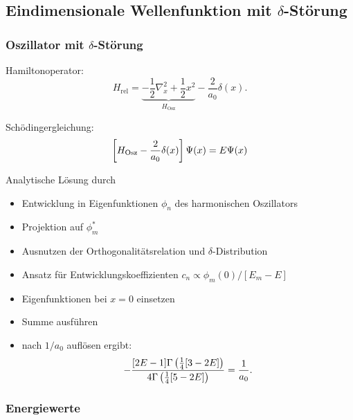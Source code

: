 \documentclass[ngerman, fleqn]{beamer}
\begin{document}
\subsection{Eindimensionale Wellenfunktion mit $\delta$-Störung}

\begin{frame}
    \frametitle{Oszillator mit $\delta$-Störung}

    Hamiltonoperator:
    \[
        H_\text{rel} = \underbrace{- \frac12 \nabla_x^2 + \frac 12
        x^2}_{H_\text{Osz}} - \frac2{a_0} \delta(x).
    \]

    Schödingergleichung:
    \[
        \sbr{H_\text{Osz} - \frac2{a_0} \delta(x)} \Psi(x) = E \Psi(x)
    \]

    Analytische Lösung durch \cite{Busch/Two_Cold}
\end{frame}

\begin{frame}
    \begin{itemize}
        \item
            Entwicklung in Eigenfunktionen $\phi_n$ des harmonischen Oszillators
        \item
            Projektion auf $\phi_m^*$
        \item
            Ausnutzen der Orthogonalitätsrelation und $\delta$-Distribution
        \item
            Ansatz für Entwicklungskoeffizienten $c_n \propto \phi_m(0)/[E_m - E]$
        \item
            Eigenfunktionen bei $x = 0$ einsetzen
        \item
            Summe ausführen
        \item
            nach $1/a_0$ auflösen ergibt:
            \[
                - \frac{[2E-1]\Gamma\del{\frac 14[3-2E]}}{4 \Gamma\del{\frac
                14[5-2E]}} = \frac1{a_0}.
            \]
    \end{itemize}
\end{frame}

\begin{frame}
    \frametitle{Energiewerte}
    

\end{frame}
\end{document}
